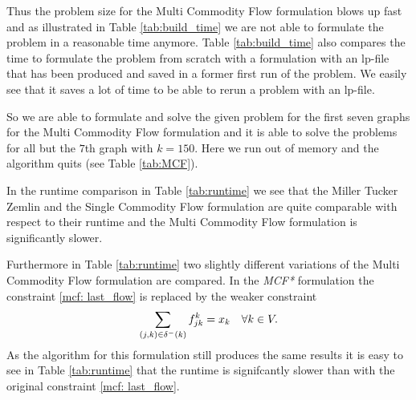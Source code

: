 \documentclass{article}
\begin{document}
	Thus the problem size for the Multi Commodity Flow formulation blows up fast and as illustrated in Table \ref{tab:build_time} we are not able to formulate the problem in a reasonable time anymore. Table \ref{tab:build_time} also compares the time to formulate the problem from scratch with a formulation with an lp-file that has been produced and saved in a former first run of the problem. We easily see that it saves a lot of time to be able to rerun a problem with an lp-file.
	
	So we are able to formulate and solve the given problem for the first seven graphs for the Multi Commodity Flow formulation and it is able to solve the problems for all but the $7$th graph with $k=150$. Here we run out of memory and the algorithm quits (see Table \ref{tab:MCF}).
	
	In the runtime comparison in Table \ref{tab:runtime} we see that the Miller Tucker Zemlin and the Single Commodity Flow formulation are quite comparable with respect to their runtime and the Multi Commodity Flow formulation is significantly slower.
	
	Furthermore in Table \ref{tab:runtime} two slightly different variations of the Multi Commodity Flow formulation are compared. In the \emph{MCF*} formulation the constraint \eqref{mcf: last_flow} is replaced by the weaker constraint
	\begin{equation}
		\sum_{(j,k) \in \delta^-(k)} f_{jk}^k = x_k  \quad \forall k \in V  \label{mcf2: last_flow}. \\
	\end{equation}
	As the algorithm for this formulation still produces the same results it is easy to see in Table \ref{tab:runtime} that the runtime is signifcantly slower than with the original constraint \eqref{mcf: last_flow}.
	
\end{document}
